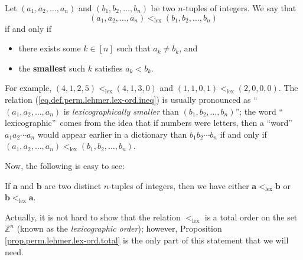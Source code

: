 \begin{definition}
\label{def.perm.lehmer.lex-ord}Let $\left(  a_{1},a_{2},\ldots,a_{n}\right)  $
and $\left(  b_{1},b_{2},\ldots,b_{n}\right)  $ be two $n$-tuples of integers.
We say that%
\begin{equation}
\left(  a_{1},a_{2},\ldots,a_{n}\right)  <_{\operatorname*{lex}}\left(
b_{1},b_{2},\ldots,b_{n}\right)  \label{eq.def.perm.lehmer.lex-ord.ineq}%
\end{equation}
if and only if

\begin{itemize}
\item there exists some $k\in\left[  n\right]  $ such that $a_{k}\neq b_{k}$, and

\item the \textbf{smallest} such $k$ satisfies $a_{k}<b_{k}$.
\end{itemize}
\end{definition}

For example, $\left(  4,1,2,5\right)  <_{\operatorname*{lex}}\left(
4,1,3,0\right)  $ and $\left(  1,1,0,1\right)  <_{\operatorname*{lex}}\left(
2,0,0,0\right)  $. The relation (\ref{eq.def.perm.lehmer.lex-ord.ineq}) is
usually pronounced as \textquotedblleft$\left(  a_{1},a_{2},\ldots
,a_{n}\right)  $ is \emph{lexicographically smaller} than $\left(  b_{1}%
,b_{2},\ldots,b_{n}\right)  $\textquotedblright; the word \textquotedblleft
lexicographic\textquotedblright\ comes from the idea that if numbers were
letters, then a \textquotedblleft word\textquotedblright\ $a_{1}a_{2}\cdots
a_{n}$ would appear earlier in a dictionary than $b_{1}b_{2}\cdots b_{n}$ if
and only if $\left(  a_{1},a_{2},\ldots,a_{n}\right)  <_{\operatorname*{lex}%
}\left(  b_{1},b_{2},\ldots,b_{n}\right)  $.

Now, the following is easy to see:

\begin{proposition}
\label{prop.perm.lehmer.lex-ord.total}If $\mathbf{a}$ and $\mathbf{b}$ are two
distinct $n$-tuples of integers, then we have either $\mathbf{a}%
<_{\operatorname*{lex}}\mathbf{b}$ or $\mathbf{b}<_{\operatorname*{lex}%
}\mathbf{a}$.
\end{proposition}

Actually, it is not hard to show that the relation $<_{\operatorname*{lex}}$
is a total order on the set $\mathbb{Z}^{n}$ (known as the \emph{lexicographic
order}); however, Proposition \ref{prop.perm.lehmer.lex-ord.total} is the only
part of this statement that we will need.

